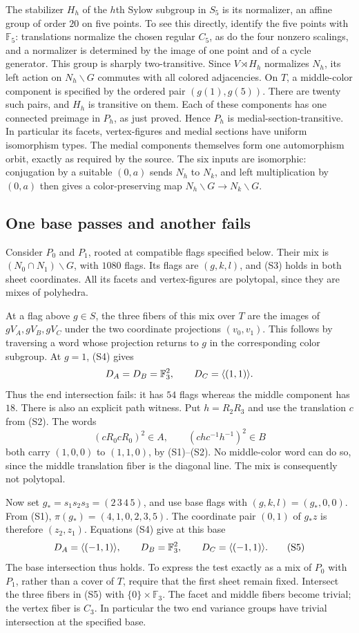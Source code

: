 The stabilizer $H_h$ of the $h$th Sylow subgroup in $S_5$ is its
normalizer, an affine group of order $20$ on five points. To see this
directly, identify the five points with $\mathbb F_5$: translations
normalize the chosen regular $C_5$, as do the four nonzero scalings,
and a normalizer is determined by the image of one point and of a
cycle generator. This group is sharply two-transitive. Since
$V\rtimes H_h$ normalizes $N_h$, its left action on $N_h\backslash G$
commutes with all colored adjacencies. On $T$, a middle-color component
is specified by the ordered pair $(g(1),g(5))$. There are twenty such
pairs, and $H_h$ is transitive on them. Each of these components has
one connected preimage in $P_h$, as just proved. Hence $P_h$ is
medial-section-transitive. In particular its facets, vertex-figures and
medial sections have uniform isomorphism types. The medial components themselves form one
automorphism orbit, exactly as required by the source. The six inputs
are isomorphic: conjugation by a suitable $(0,a)$ sends $N_h$ to $N_k$,
and left multiplication by $(0,a)$ then gives a color-preserving map
$N_h\backslash G\to N_k\backslash G$.

\subsection{One base passes and another fails}
Consider $P_0$ and $P_1$, rooted at compatible flags specified below.
Their mix is $(N_0\cap N_1)\backslash G$, with $1080$ flags. Its flags
are $(g,k,l)$, and (S3) holds in both sheet coordinates. All its facets
and vertex-figures are polytopal, since they are mixes of polyhedra.

At a flag above $g\in S$, the three fibers of this mix over $T$ are the
images of $gV_A,gV_B,gV_C$ under the two coordinate projections
$(v_0,v_1)$. This follows by traversing a word whose projection returns
to $g$ in the corresponding color subgroup. At $g=1$, (S4) gives
\[
 D_A=D_B=\mathbb F_3^2,\qquad D_C=\langle(1,1)\rangle.
\]
Thus the end intersection fails: it has $54$ flags whereas the middle
component has $18$. There is also an explicit path witness. Put
$h=R_2R_3$ and use the translation $c$ from (S2). The words
\[
 (cR_0cR_0)^2\in A,\qquad (chc^{-1}h^{-1})^2\in B
\]
both carry $(1,0,0)$ to $(1,1,0)$, by (S1)--(S2). No middle-color word
can do so, since the middle translation fiber is the diagonal line.
The mix is consequently not polytopal.

Now set $g_*=s_1s_2s_3=(2\,3\,4\,5)$, and use base flags with
$(g,k,l)=(g_*,0,0)$. From (S1), $\pi(g_*)=(4,1,0,2,3,5)$.
The coordinate pair $(0,1)$ of $g_*z$ is therefore $(z_2,z_1)$.
Equations (S4) give at this base
\[
 D_A=\langle(-1,1)\rangle,\qquad D_B=\mathbb F_3^2,
 \qquad D_C=\langle(-1,1)\rangle.                              \tag{S5}
\]
The base intersection thus holds. To express the test exactly as a mix
of $P_0$ with $P_1$, rather than a cover of $T$, require that the first
sheet remain fixed. Intersect the three fibers in (S5) with
$\{0\}\times\mathbb F_3$. The facet and middle fibers become trivial;
the vertex fiber is $C_3$. In particular the two end variance groups
have trivial intersection at the specified base.

